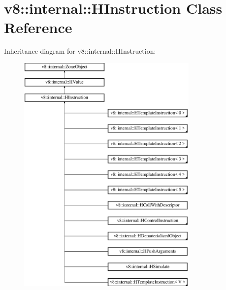 \hypertarget{classv8_1_1internal_1_1_h_instruction}{}\section{v8\+:\+:internal\+:\+:H\+Instruction Class Reference}
\label{classv8_1_1internal_1_1_h_instruction}
Inheritance diagram for v8\+:\+:internal\+:\+:H\+Instruction\+:\begin{figure}[H]
\begin{center}
\leavevmode
\includegraphics[height=12.000000cm]{classv8_1_1internal_1_1_h_instruction}
\end{center}
\end{figure}
